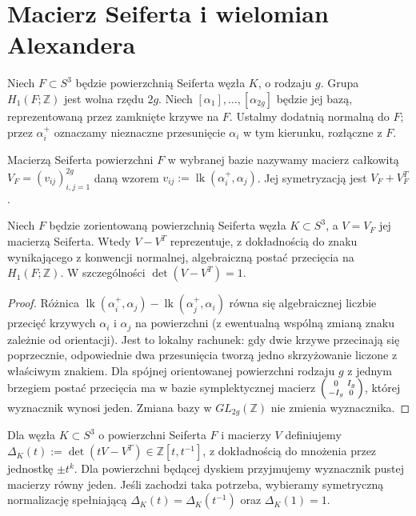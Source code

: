 \section{Macierz Seiferta i wielomian Alexandera}
\label{sec:kt-alexander}

Niech $F\subset S^3$ będzie powierzchnią Seiferta węzła $K$,
o rodzaju $g$. Grupa $H_1(F;\mathbb Z)$ jest wolna rzędu $2g$.
Niech $[\alpha_1],\dots,[\alpha_{2g}]$ będzie jej bazą,
reprezentowaną przez zamknięte krzywe na $F$. Ustalmy dodatnią
normalną do $F$; przez $\alpha_i^+$ oznaczamy nieznaczne
przesunięcie $\alpha_i$ w tym kierunku, rozłączne z $F$.

\begin{definicja}
Macierzą Seiferta powierzchni $F$ w wybranej bazie nazywamy
macierz całkowitą $V_F=(v_{ij})_{i,j=1}^{2g}$ daną wzorem
$v_{ij}:=\operatorname{lk}(\alpha_i^+,\alpha_j)$.
Jej symetryzacją jest $V_F+V_F^T$.
\end{definicja}

\begin{stwierdzenie}
Niech $F$ będzie zorientowaną powierzchnią Seiferta węzła
$K\subset S^3$, a $V=V_F$ jej macierzą Seiferta. Wtedy
$V-V^T$ reprezentuje, z dokładnością do znaku wynikającego
z konwencji normalnej, algebraiczną postać przecięcia
na $H_1(F;\mathbb Z)$. W szczególności $\det(V-V^T)=1$.
\end{stwierdzenie}

\begin{proof}
Różnica $\operatorname{lk}(\alpha_i^+,\alpha_j)
-\operatorname{lk}(\alpha_j^+,\alpha_i)$ równa się algebraicznej
liczbie przecięć krzywych $\alpha_i$ i $\alpha_j$ na powierzchni
(z ewentualną wspólną zmianą znaku zależnie od orientacji).
Jest to lokalny rachunek: gdy dwie krzywe przecinają się
poprzecznie, odpowiednie dwa przesunięcia tworzą jedno
skrzyżowanie liczone z właściwym znakiem. Dla spójnej
orientowanej powierzchni rodzaju $g$ z jednym brzegiem
postać przecięcia ma w bazie symplektycznej macierz
$\begin{psmallmatrix}0&I_g\\-I_g&0\end{psmallmatrix}$,
której wyznacznik wynosi jeden. Zmiana bazy w $GL_{2g}(\mathbb Z)$
nie zmienia wyznacznika.
\end{proof}

\begin{definicja}
Dla węzła $K\subset S^3$ o powierzchni Seiferta $F$
i macierzy $V$ definiujemy
$\Delta_K(t):=\det(tV-V^T)\in\mathbb Z[t,t^{-1}]$,
z dokładnością do mnożenia przez jednostkę $\pm t^k$.
Dla powierzchni będącej dyskiem przyjmujemy wyznacznik pustej
macierzy równy jeden. Jeśli zachodzi taka potrzeba, wybieramy
symetryczną normalizację spełniającą
$\Delta_K(t)=\Delta_K(t^{-1})$ oraz $\Delta_K(1)=1$.
\end{definicja}

